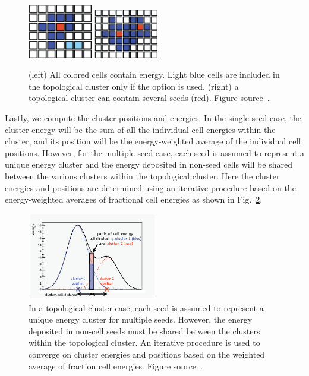 \begin{figure}[t!]
\centering
\includegraphics[width=0.25\textwidth]{figures/topological_cluster_oneseed.png}
\includegraphics[width=0.25\textwidth]{figures/topological_cluster_many_Seeds.png}
\caption[Types of topological cluster]
        {(left) All colored cells contain energy. Light blue cells are included in the topological cluster only if the option is used.
          (right) a topological cluster can contain several seeds (red).
          Figure source~\cite{Clustering}.}
\label{fig:topo_cluster}
\end{figure}

Lastly, we compute the cluster positions and energies.
In the single-seed case, the cluster energy will be the sum of all the individual cell energies within the cluster, and its position will be the energy-weighted average of the individual cell positions.
However, for the multiple-seed case, each seed is assumed to represent a unique energy cluster and the energy deposited in non-seed cells will be shared between the various clusters within the topological cluster.
Here the cluster energies and positions are determined using an iterative procedure based on the energy-weighted averages of fractional cell energies as shown in Fig.~\ref{fig:clustering}. %

\begin{figure}[t!]
\centering
\includegraphics[width=0.50\textwidth]{figures/energy_sharing.png}
\caption[Energy shared between clusters]
        {In a topological cluster case, each seed is assumed to represent a unique energy cluster for multiple seeds.
          However, the energy deposited in non-cell seeds must be shared between the clusters within the topological cluster.
          An iterative procedure is used to converge on cluster energies and positions based on the weighted average of fraction cell energies.
          Figure source~\cite{Clustering}.}
\label{fig:clustering}
\end{figure}


